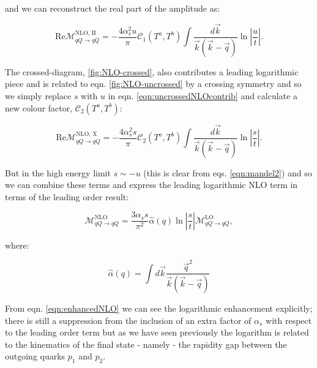 		and we can reconstruct the real part of the amplitude as:

		\begin{equation}
			\text{Re}\mathcal{M}_{qQ\rightarrow qQ}^{\text{NLO, II}} = -\frac{4\alpha_s^2u}{\pi} \mathcal{C}_1(T^a,T^b)
			\int \frac{d\vec{k}}{\vec{k}(\vec{k} - \vec{q})}\ln\left|\frac{u}{t}\right|.
			\label{eqn:uncrossedNLOcontrib}
		\end{equation}

		The crossed-diagram, \eqref{fig:NLO-crossed}, also contributes a leading logarithmic piece and is related to
		eqn. \eqref{fig:NLO-uncrossed} by a crossing symmetry and so we simply replace $s$ with $u$ in eqn.
		\eqref{eqn:uncrossedNLOcontrib} and calculate a new colour factor, $\mathcal{C}_2(T^a,T^b)$:

		\begin{equation}
			\text{Re}\mathcal{M}_{qQ\rightarrow qQ}^{\text{NLO, X}} = -\frac{4\alpha_s^2s}{\pi} \mathcal{C}_2(T^a,T^b)
			\int \frac{d\vec{k}}{\vec{k}(\vec{k} - \vec{q})}\ln\left|\frac{s}{t}\right|.
			\label{eqn:crossedNLOcontrib}
		\end{equation}

		But in the high energy limit $s\sim -u$ (this is clear from eqs. \eqref{eqn:mandel2}) and so we
		can combine these terms and express the leading logarithmic NLO term in terms of the leading order
		result:

		\begin{equation}
			\mathcal{M}_{qQ\rightarrow qQ}^{\text{NLO}} = \frac{3\alpha_ss}{\pi^2}
			\hat{\alpha}(q)\ln\left|\frac{s}{t}\right|
			\mathcal{M}_{qQ\rightarrow qQ}^{\text{LO}},
			\label{eqn:enhancedNLO}
		\end{equation}

		where:

		\begin{equation}
			\hat{\alpha}(q) = \int d\vec{k}\frac{\vec{q}^2}{\vec{k}(\vec{k} - \vec{q})}
		\end{equation}

		From eqn. \ref{eqn:enhancedNLO} we can see the logarithmic enhancement explicitly; there is still
		a suppression from the inclusion of an extra factor of $\alpha_s$ with respect to the leading
		order term but as we have seen previously the logarithm is related to the kinematics of the final
		state - namely - the rapidity gap between the outgoing quarks $p_1$ and $p_2$.

